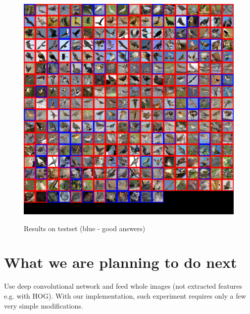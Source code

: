 \documentclass[a4paper]{article}
\begin{document}
\begin{figure}[h]
    \caption[]{Results on testset (blue - good answers)}
    \centering
    \includegraphics[page=2,width=1.0\textwidth]{eval.png}
    \label{fig:eval}
\end{figure}

\section{What we are planning to do next}
Use deep convolutional network and feed whole images
(not extracted features e.g. with HOG).
With our implementation, such experiment requires only a few very simple modifications.
\end{document}
